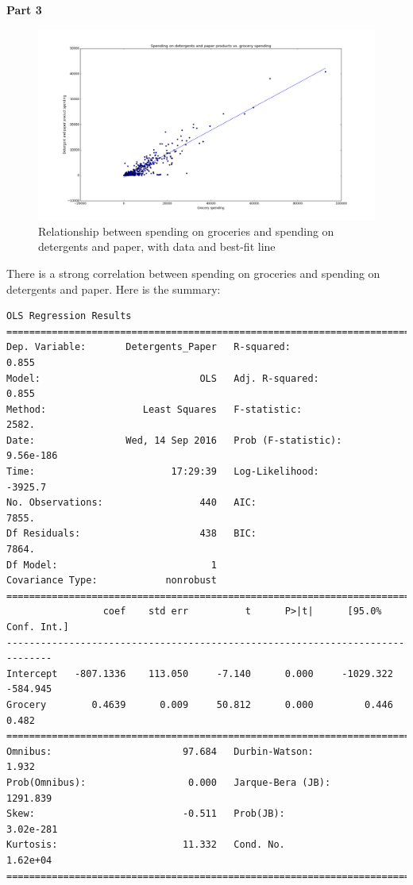 \documentclass{article}
\begin{document}
	\newpage
	
	\noindent
	\textbf{Part 3}\\
	\begin{figure}
		\includegraphics[scale=0.3]{part3.png}
		\caption{Relationship between spending on groceries and spending on detergents and paper, with data and best-fit line}
	\end{figure}
	There is a strong correlation between spending on groceries and spending on detergents and paper. Here is the summary:
	\begin{lstlisting}[basicstyle=\tiny]
                            OLS Regression Results                            
==============================================================================
Dep. Variable:       Detergents_Paper   R-squared:                       0.855
Model:                            OLS   Adj. R-squared:                  0.855
Method:                 Least Squares   F-statistic:                     2582.
Date:                Wed, 14 Sep 2016   Prob (F-statistic):          9.56e-186
Time:                        17:29:39   Log-Likelihood:                -3925.7
No. Observations:                 440   AIC:                             7855.
Df Residuals:                     438   BIC:                             7864.
Df Model:                           1                                         
Covariance Type:            nonrobust                                         
==============================================================================
                 coef    std err          t      P>|t|      [95.0% Conf. Int.]
------------------------------------------------------------------------------
Intercept   -807.1336    113.050     -7.140      0.000     -1029.322  -584.945
Grocery        0.4639      0.009     50.812      0.000         0.446     0.482
==============================================================================
Omnibus:                       97.684   Durbin-Watson:                   1.932
Prob(Omnibus):                  0.000   Jarque-Bera (JB):             1291.839
Skew:                          -0.511   Prob(JB):                    3.02e-281
Kurtosis:                      11.332   Cond. No.                     1.62e+04
==============================================================================
	\end{lstlisting}
	
\end{document}
